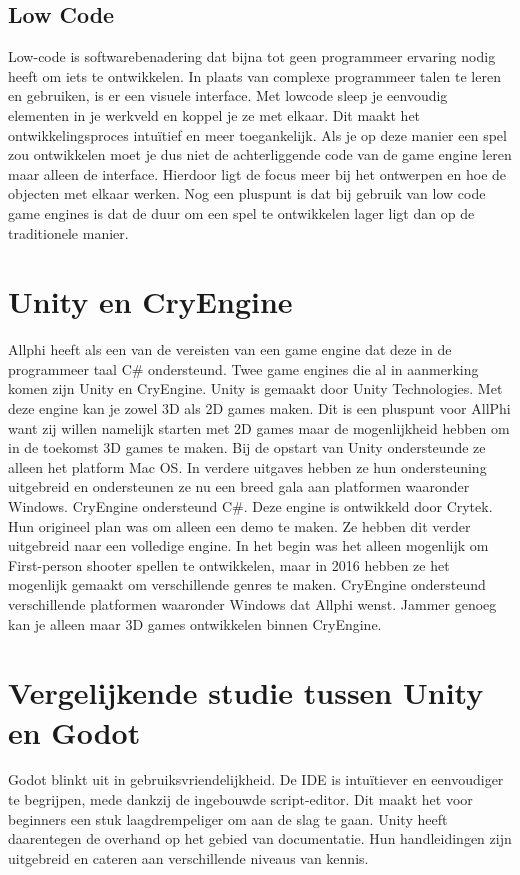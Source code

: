 \subsection{Low Code}
Low-code is softwarebenadering dat bijna tot geen programmeer ervaring nodig heeft om iets te ontwikkelen. In plaats van complexe programmeer talen te leren en gebruiken, is er een visuele interface.\autocite{Kissflow2024} Met lowcode sleep je eenvoudig elementen in je werkveld en koppel je ze met elkaar. Dit maakt het ontwikkelingsproces intuïtief en meer toegankelijk. Als je op deze manier een spel zou ontwikkelen moet je dus niet de achterliggende code van de game engine leren maar alleen de interface. Hierdoor ligt de focus meer bij het ontwerpen en hoe de objecten met elkaar werken. Nog een pluspunt is dat bij gebruik van low code game engines is dat de duur om een spel te ontwikkelen lager ligt dan op de traditionele manier. \autocite{Trigo2022}

\section{Unity en CryEngine}
Allphi heeft als een van de vereisten van een game engine dat deze in de programmeer taal C\# ondersteund. Twee game engines die al in aanmerking komen zijn Unity en CryEngine. Unity is gemaakt door Unity Technologies. Met deze engine kan je zowel 3D als 2D games maken. Dit is een pluspunt voor AllPhi want zij willen namelijk starten met 2D games maar de mogenlijkheid hebben om in de toekomst 3D games te maken. Bij de opstart van Unity ondersteunde ze alleen het platform Mac OS. In verdere uitgaves hebben ze hun ondersteuning uitgebreid en ondersteunen ze nu een breed gala aan platformen waaronder Windows. CryEngine ondersteund C\#. Deze engine is ontwikkeld door Crytek. Hun origineel plan was om alleen een demo te maken. Ze hebben dit verder uitgebreid naar een volledige engine. In het begin was het alleen mogenlijk om First-person shooter spellen te ontwikkelen, maar in 2016 hebben ze het mogenlijk gemaakt om verschillende genres te maken. CryEngine ondersteund verschillende platformen waaronder Windows dat Allphi wenst. Jammer genoeg kan je alleen maar 3D games ontwikkelen binnen CryEngine. \autocite{Barczak2021}

\section{Vergelijkende studie tussen Unity en Godot}
Godot blinkt uit in gebruiksvriendelijkheid. De IDE is intuïtiever en eenvoudiger te begrijpen, mede dankzij de ingebouwde script-editor. Dit maakt het voor beginners een stuk laagdrempeliger om aan de slag te gaan. Unity heeft daarentegen de overhand op het gebied van documentatie. Hun handleidingen zijn uitgebreid en cateren aan verschillende niveaus van kennis. \autocite{flomen2020game}

